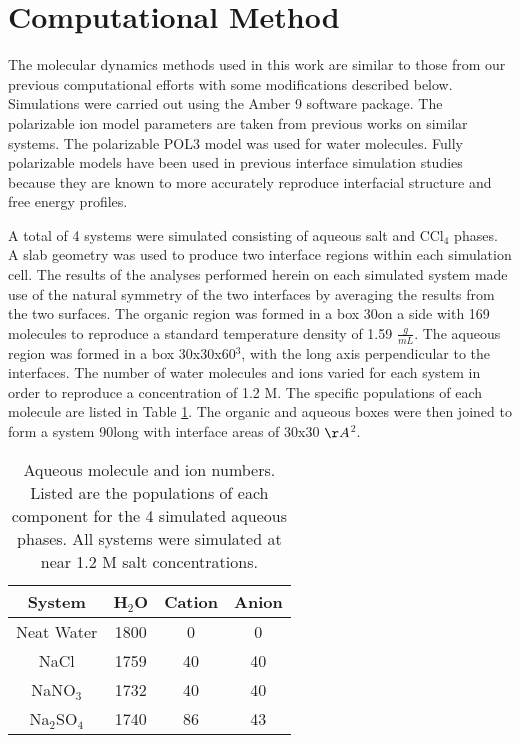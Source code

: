 \section{Computational Method}

The molecular dynamics methods used in this work are similar to those from our previous computational efforts with some modifications described below.\cite{Hore2008,Walker2006b,Hore2007} Simulations were carried out using the Amber 9 software package. The polarizable ion model parameters are taken from previous works on similar systems.\cite{Chang1997a,Dang1999,Thomas2007,Hrobarik2006,Chang1995} The polarizable POL3 model was used for water molecules.\cite{Caldwell1995} Fully polarizable models have been used in previous interface simulation studies because they are known to more accurately reproduce interfacial structure and free energy profiles.\cite{Rivera2006,Wick2007,Petersen2005b,Salvador2003,Dang1998}

A total of 4 systems were simulated consisting of aqueous salt and CCl$_4$ phases. A slab geometry was used to produce two interface regions within each simulation cell.\cite{Hore2007}  The results of the analyses performed herein on each simulated system made use of the natural symmetry of the two interfaces by averaging the results from the two surfaces. The organic region was formed in a box 30\angs on a side with 169 \ctc molecules to reproduce a standard temperature density of 1.59 $\frac{g}{mL}$. The aqueous region was formed in a box 30x30x60\angs$^3$, with the long axis perpendicular to the interfaces. The number of water molecules and ions varied for each system in order to reproduce a concentration of 1.2 M. The specific populations of each molecule are listed in Table \ref{table:densities}. The organic and aqueous boxes were then joined to form a system 90\angs long with interface areas of 30x30 $\AA$$^2$.

\begin{table}[htdp]
	\begin{center}
	\begin{tabular}{|c||c|c|c|}
		\hline
		System & H$_2$O & Cation & Anion \\ \hline
		Neat Water & 1800 & 0 & 0 \\ 
		NaCl & 1759 & 40 & 40 \\
		NaNO$_3$ & 1732 & 40 & 40 \\
		Na$_2$SO$_4$ & 1740 & 86 & 43 \\
		\hline
	\end{tabular}
	\end{center}
	\caption{Aqueous molecule and ion numbers. Listed are the populations of each component for the 4 simulated aqueous phases. All systems were simulated at near 1.2 M salt concentrations.}
	\label{table:densities}
\end{table}

